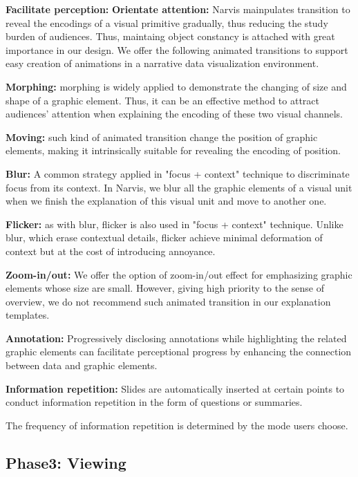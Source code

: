 \textbf{Facilitate perception: }
\textbf{Orientate attention: }
Narvis mainpulates transition to reveal the encodings of a visual primitive gradually, thus reducing the study burden of audiences. Thus, maintaing object constancy is attached with great importance in our design. 
We offer the following animated transitions to support easy creation of animations in a narrative data visualization environment.\par 
\textbf{Morphing:} morphing is widely applied to demonstrate the changing of size and shape of a graphic element. Thus, it can be an effective method to attract audiences' attention when explaining the encoding of these two visual channels. \par
\textbf{Moving:} such kind of animated transition change the position of graphic elements, making it intrinsically suitable for revealing the encoding of position. \par 
\textbf{Blur:} A common strategy applied in "focus + context" technique to discriminate focus from its context. In Narvis, we blur all the graphic elements of a visual unit when we finish the explanation of this visual unit and move to another one. \par
\textbf{Flicker:} as with blur, flicker is also used in "focus + context" technique. Unlike blur, which  erase contextual details, flicker achieve minimal deformation of context but at the cost of introducing annoyance. \par
\textbf{Zoom-in/out:} We offer the option of zoom-in/out effect for emphasizing graphic elements whose size are small. However, giving high priority to the sense of overview, we do not recommend such animated transition in our explanation templates.  \par
\textbf{Annotation:} Progressively disclosing annotations while highlighting the related graphic elements can facilitate perceptional progress by enhancing the connection between data and graphic elements.\cite{bryan_temporal_2016}  \par
\textbf{Information repetition:} Slides are automatically inserted at certain points to conduct information repetition in the form of questions or summaries. \par 
The frequency of information repetition is determined by the mode users choose. \par
\subsection{Phase3: Viewing}
